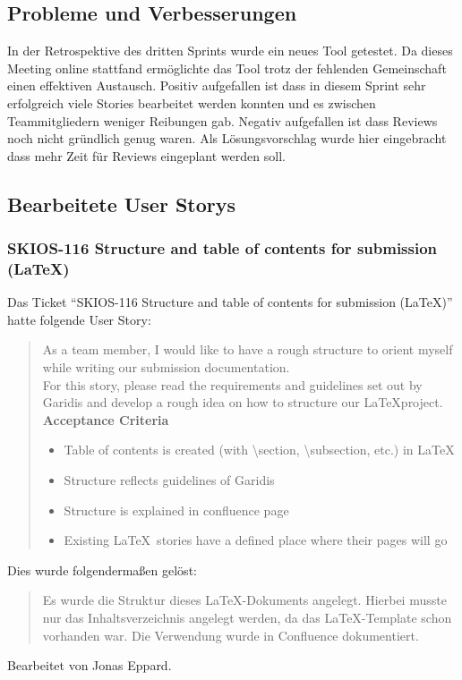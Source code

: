 \subsection{Probleme und Verbesserungen}
In der Retrospektive des dritten Sprints wurde ein neues Tool getestet. Da dieses Meeting online stattfand ermöglichte das Tool trotz der fehlenden Gemeinschaft einen effektiven Austausch.
Positiv aufgefallen ist dass in diesem Sprint sehr erfolgreich viele Stories bearbeitet werden konnten und es zwischen Teammitgliedern weniger Reibungen gab. Negativ aufgefallen ist dass Reviews noch nicht gründlich genug waren. Als Lösungsvorschlag wurde hier eingebracht dass mehr Zeit für Reviews eingeplant werden soll.

\subsection{Bearbeitete User Storys}

\subsubsection{SKIOS-116 Structure and table of contents for submission (\LaTeX)}
Das Ticket \enquote{SKIOS-116 Structure and table of contents for submission (\LaTeX)}
hatte folgende User Story:
\begin{quotation}
    As a team member, I would like to have a rough structure to orient myself while writing our submission documentation.\\
    For this story, please read the requirements and guidelines set out by Garidis and develop a rough idea on how to structure our \LaTeX project.\\
    \textbf{Acceptance Criteria}
    \begin{itemize}
        \item Table of contents is created (with \textbackslash{}section, \textbackslash{}subsection, etc.) in \LaTeX
        \item Structure reflects guidelines of Garidis
        \item Structure is explained in confluence page
        \item Existing \LaTeX~stories have a defined place where their pages will go
    \end{itemize}
\end{quotation}
Dies wurde folgendermaßen gelöst:
\begin{quotation}
    Es wurde die Struktur dieses \LaTeX-Dokuments angelegt. Hierbei musste nur das Inhaltsverzeichnis
    angelegt werden, da das \LaTeX-Template schon vorhanden war.
    Die Verwendung wurde in Confluence dokumentiert.
\end{quotation}
Bearbeitet von Jonas Eppard.

